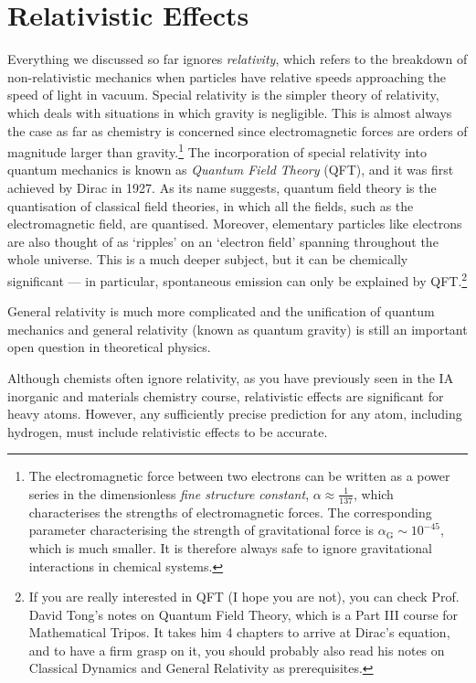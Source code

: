 \documentclass{article}
\theoremstyle{plain}\theoremheaderfont{\normalfont\itshape}\theorembodyfont{\rmfamily}\theoremseparator{.}\newtheorem*{rem}{Remark}\newtheorem*{ex}{Example}\newtheorem*{proof}{Proof}\newtheorem*{altp}{Alternative proof}
\theoremstyle{plain}\theoremheaderfont{\normalfont\bfseries}\theorembodyfont{\rmfamily}\theoremseparator{.}\newtheorem{thm}{Theorem}[section]\newtheorem{lem}[thm]{Lemma}\newtheorem{prop}[thm]{Proposition}\newtheorem*{cor}{Corollary}\newtheorem{defn}[thm]{Definition}\newtheorem{clm}[thm]{Claim}\newtheorem{clminproof}{Claim}
\theoremstyle{break}\theoremheaderfont{\normalfont\itshape}\theorembodyfont{\rmfamily}\theoremseparator{.\medskip}\newtheorem*{proofskip}{Proof}\newtheorem*{exs}{Examples}\newtheorem*{rems}{Remarks}
\theoremstyle{break}\theoremheaderfont{\normalfont\bfseries}\theorembodyfont{\rmfamily}\theoremseparator{.\medskip}\newtheorem{lemskip}[thm]{Lemma}\newtheorem{defnskip}[thm]{Definition}\newtheorem{propskip}[thm]{Proposition}\newtheorem{thmskip}[thm]{Theorem}
\numberwithin{equation}{section}
\begin{document}
    \section{Relativistic Effects}
    Everything we discussed so far ignores \textit{relativity}, which refers to the breakdown of non-relativistic mechanics when particles have relative speeds approaching the speed of light in vacuum. Special relativity is the simpler theory of relativity, which deals with situations in which gravity is negligible. This is almost always the case as far as chemistry is concerned since electromagnetic forces are orders of magnitude larger than gravity.\footnote{The electromagnetic force between two electrons can be written as a power series in the dimensionless \textit{fine structure constant}, \(\alpha\approx\frac{1}{137}\), which characterises the strengths of electromagnetic forces. The corresponding parameter characterising the strength of gravitational force is \(\alpha_{\text{G}}\sim 10^{-45}\), which is much smaller. It is therefore always safe to ignore gravitational interactions in chemical systems.} The incorporation of special relativity into quantum mechanics is known as \textit{Quantum Field Theory} (QFT), and it was first achieved by Dirac in 1927. As its name suggests, quantum field theory is the quantisation of classical field theories, in which all the fields, such as the electromagnetic field, are quantised. Moreover, elementary particles like electrons are also thought of as `ripples' on an `electron field' spanning throughout the whole universe. This is a much deeper subject, but it can be chemically significant --- in particular, spontaneous emission can only be explained by QFT.\footnote{If you are really interested in QFT (I hope you are not), you can check Prof. David Tong's notes on Quantum Field Theory, which is a Part III course for Mathematical Tripos. It takes him 4 chapters to arrive at Dirac's equation, and to have a firm grasp on it, you should probably also read his notes on Classical Dynamics and General Relativity as prerequisites.}
    
    General relativity is much more complicated and the unification of quantum mechanics and general relativity (known as quantum gravity) is still an important open question in theoretical physics.

    Although chemists often ignore relativity, as you have previously seen in the IA inorganic and materials chemistry course, relativistic effects are significant for heavy atoms. However, any sufficiently precise prediction for any atom, including hydrogen, must include relativistic effects to be accurate.
\end{document}

